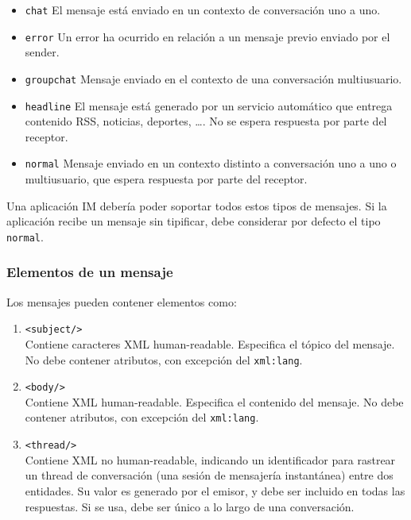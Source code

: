 \documentclass[a4paper, 11pt]{article} %
\begin{document}
      \begin{itemize}
	\item \texttt{chat} El mensaje está enviado en un contexto de conversación uno a uno.
	\item \texttt{error} Un error ha ocurrido en relación a un mensaje previo enviado por el sender.
	\item \texttt{groupchat} Mensaje enviado en el contexto de una conversación multiusuario.
	\item \texttt{headline} El mensaje está generado por un servicio automático que entrega contenido RSS, noticias, 
	  deportes, \ldots. No se espera respuesta por parte del receptor.
	\item \texttt{normal} Mensaje enviado en un contexto distinto a conversación uno a uno o multiusuario, que espera
	  respuesta por parte del receptor.
      \end{itemize}
      
      Una aplicación IM debería poder soportar todos estos tipos de mensajes. Si la aplicación recibe un mensaje sin tipificar,
      debe considerar por defecto el tipo \texttt{normal}.
    
    \subsubsection{Elementos de un mensaje}
      Los mensajes pueden contener elementos como:
      \begin{enumerate}
	\item \texttt{<subject/>}\\
	Contiene caracteres XML human-readable. Especifica el tópico del mensaje. No debe contener atributos, con excepción
	del \texttt{xml:lang}.
	
	\item \texttt{<body/>}\\
	Contiene XML human-readable. Especifica el contenido del mensaje. No debe contener atributos, con excepción
	del \texttt{xml:lang}.
	
	\item \texttt{<thread/>}\\
	Contiene XML no human-readable, indicando un identificador para rastrear un thread de conversación (una sesión de
	mensajería instantánea) entre dos entidades. Su valor es generado por el emisor, y debe ser incluido en todas 
	las respuestas. Si se usa, debe ser único a lo largo de una conversación.
      \end{enumerate}
\end{document}
